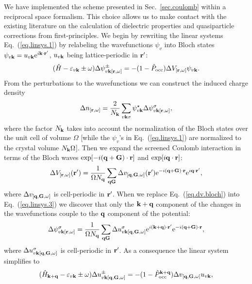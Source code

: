 \documentclass[twocolumn,prb,showpacs,superscriptaddress]{revtex4}
\def\w{\omega}
\def\H{\hat{H}}
\def\P{\hat{P}_{\rm occ}}
\def\E{\varepsilon}
\def\q{{\bf q}}
\def\s{\sigma}
\def\k{{\bf k}}
\def\G{{\bf G}}
\def\r{{\bf r}}
\def\rp{{\bf r^\prime}}
\begin{document}
We have implemented the scheme presented in Sec.\ \ref{sec.coulomb}
within a reciprocal space formalism. This choice allows us to make
contact with the existing literature on the 
calculation of dielectric properties and quasiparticle 
corrections from first-principles.\cite{hl86,balde_tosa,baroni-resta,hl86-prb,reining,cpm}
%
We begin by rewriting 
the linear systems Eq.\ (\ref{eq.linsys.1})
by relabeling the wavefunctions $\psi_v$ into Bloch states
$\psi_{v\k}=u_{v\k} {\rm e}^{i\k\cdot\rp}$, $u_{v\k}$ being
lattice-periodic in $\rp$:
  \begin{equation}\label{eq.linsys.3}
  (\H-\E_{v\k}\pm\w) \Delta \psi^\pm_{v\k[\r,\w]}  = -(1-\P)  \Delta V_{[\r,\w]} \psi_{v\k}.
  \end{equation}
From the perturbations to the wavefunctions we can construct the
induced charge density
  \begin{equation}
  \Delta n_{[\r,\w]} = \frac{2}{N_\k}\sum_{v\k\s} \psi_{v\k}^\star  \Delta \psi^\s_{v\k[\r,\w]},
  \end{equation}
where the factor $N_\k$ takes into account the normalization of
the Bloch states over the unit cell of volume $\Omega$
[while the $\psi_v$'s in Eq.\ (\ref{eq.linsys.1}) are normalized to the crystal volume
$N_\k \Omega$].
Then we expand the screened Coulomb interaction in terms
of the Bloch waves ${\rm exp}[-i(\q+\G)\cdot\r]$ and ${\rm exp}[i\q\cdot\r]$:
  \begin{equation}\label{eq.dv.bloch}
  \Delta V_{[\r,\w]} (\rp) = \frac{1}{\Omega N_\q}  \sum_{\q\G} \Delta v_{[\q,\G,\w]}(\rp) 
   {\rm e}^{-i(\q+\G)\cdot\r} {\rm e}^{i\q\cdot\rp}, 
  \end{equation}
where $\Delta v_{[\q,\G,\w]}$ is cell-periodic in $\rp$.
When we replace Eq.\ (\ref{eq.dv.bloch}) into Eq.\ (\ref{eq.linsys.3})
we discover that only the $\k+\q$ component of the changes in the wavefunctions
couple to the $\q$ component of the potential:
  \begin{equation}
  \Delta \psi^\sigma_{v\k[\r,\w]} = \frac{1}{\Omega N_\q} \sum_{\q\G} \Delta u^\sigma_{v\k[\q,\G,\w]} 
  {\rm e}^{i(\k+\q)\cdot\rp} {\rm e}^{-i(\q+\G)\cdot\r},
  \end{equation}
where $\Delta u^\sigma_{v\k[\q,\G,\w]}$ is cell-periodic in $\rp$.
As a consequence the linear system simplifies to
  \begin{equation}\label{eq.linsys.4}
  (\H_{\k+\q}-\E_{v\k}\pm\w) \Delta u^\pm_{v\k[\q,\G,\w]}  = -(1-\P^{\k+\q}) \Delta v_{[\q,\G,\w]} u_{v\k},
  \end{equation}
\end{document}
